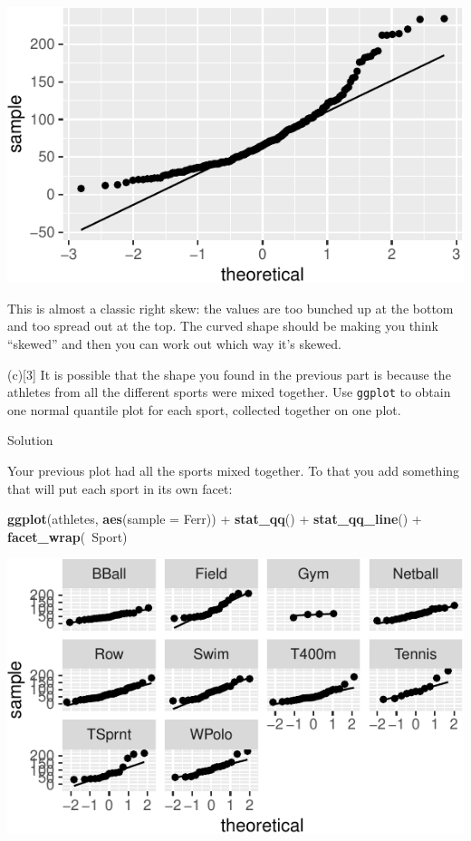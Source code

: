 \documentclass[]{tufte-book}
\newenvironment{Shaded}{}{}
\newcommand{\DataTypeTok}[1]{\textcolor[rgb]{0.56,0.13,0.00}{#1}}
\newcommand{\KeywordTok}[1]{\textcolor[rgb]{0.00,0.44,0.13}{\textbf{#1}}}
\newcommand{\NormalTok}[1]{#1}
\newcommand{\OperatorTok}[1]{\textcolor[rgb]{0.40,0.40,0.40}{#1}}
\newcommand{\StringTok}[1]{\textcolor[rgb]{0.25,0.44,0.63}{#1}}
\theoremstyle{definition}
\theoremstyle{definition}
\theoremstyle{definition}
\theoremstyle{remark}
\begin{document}
\includegraphics{09-normal-quantile_files/figure-latex/unnamed-chunk-12-1}

This is almost a classic right skew: the values are too bunched up at
the bottom and too spread out at the top. The curved shape should be
making you think ``skewed'' and then you can work out which way it's
skewed.

(c){[}3{]} It is possible that the shape you found in the previous part
is because the athletes from all the different sports were mixed
together. Use \texttt{ggplot} to obtain one normal quantile plot for
each sport, collected together on one plot.

Solution

Your previous plot had all the sports mixed together. To that you add
something that will put each sport in its own facet:

\begin{Shaded}
\begin{Highlighting}[]
\KeywordTok{ggplot}\NormalTok{(athletes, }\KeywordTok{aes}\NormalTok{(}\DataTypeTok{sample =}\NormalTok{ Ferr)) }\OperatorTok{+}\StringTok{ }\KeywordTok{stat_qq}\NormalTok{() }\OperatorTok{+}\StringTok{ }
\StringTok{    }\KeywordTok{stat_qq_line}\NormalTok{() }\OperatorTok{+}\StringTok{ }\KeywordTok{facet_wrap}\NormalTok{(}\OperatorTok{~}\NormalTok{Sport)}
\end{Highlighting}
\end{Shaded}

\includegraphics{09-normal-quantile_files/figure-latex/unnamed-chunk-13-1}
\end{document}
